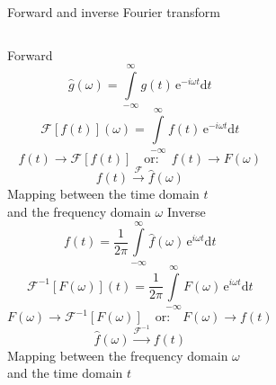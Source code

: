 \documentclass[10pt,aspectratio=169]{beamer} %
\newcommand{\ud}{\mathrm{d}}
\newcommand{\myexp}{\mathrm{e}}
\begin{document}
\begin{frame}[label=frame4]{Forward and inverse Fourier transform}
\begin{columns}[T]
	\centering
	Forward\\
	\begin{equation*}
	\hat{g}(\omega) = \int \limits_{-\infty}^{\infty} g(t)\, \myexp^{-i \omega t} \ud t 
	\end{equation*}
	\begin{equation*}
	\mathcal{F} \left[f(t) \right](\omega)=\int \limits_{-\infty}^{\infty} f(t)\, \myexp^{-i \omega t} \ud t 
	\end{equation*}
	\begin{equation*}
	f(t) \rightarrow \mathcal{F} \left[f(t) \right] \quad  \textrm{or:} \quad f(t)  \rightarrow F(\omega)
	\end{equation*}
	\begin{equation*}
	f(t) \xrightarrow{\mathcal{F}} \hat{f}(\omega)
	\end{equation*}
	Mapping between the time domain \(t\) \\and the frequency domain \(\omega\)
	\centering
	Inverse\\
	\begin{equation*}
	f(t) = \frac{1}{2 \pi} \int \limits_{-\infty}^{\infty} \hat{f}(\omega)\, \myexp^{i \omega t} \ud t 
	\end{equation*}
    \begin{equation*}	
    \mathcal{F}^{-1} \left[F(\omega) \right](t)=\frac{1}{2 \pi}  \int \limits_{-\infty}^{\infty} F(\omega)\, \myexp^{i \omega t} \ud t 
	\end{equation*}
	\begin{equation*}
	F(\omega) \rightarrow \mathcal{F}^{-1} \left[F(\omega) \right] \quad   \textrm{or:} \quad 	F(\omega) \rightarrow f(t)
	\end{equation*}
	\begin{equation*}
	\hat{f}(\omega) \xrightarrow{\mathcal{F}^{-1}}  f(t)
	\end{equation*}
	Mapping between the frequency domain  \(\omega\) \\and the time domain \(t\)
	
\end{columns}
\end{frame}
\end{document}
